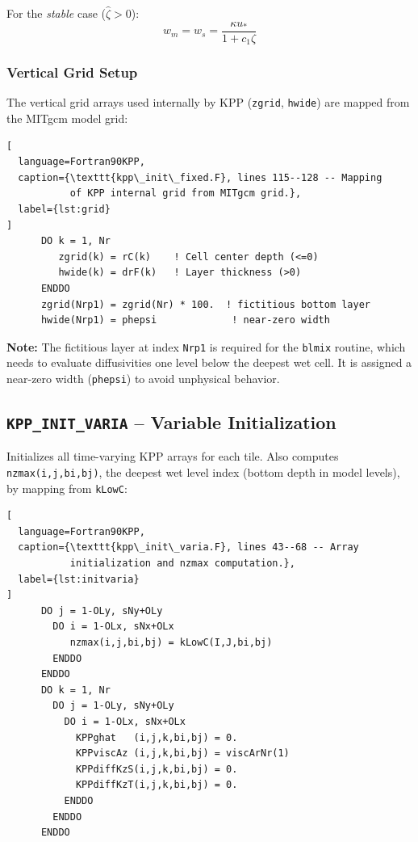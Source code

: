\documentclass[12pt,letterpaper]{article}
\newcommand{\ustar}{u_*}
\begin{document}
For the \textit{stable} case ($\hat{\zeta} > 0$):  
\begin{equation}  
w_m = w_s = \frac{\kappa \ustar}{1 + c_1 \zeta}  
\end{equation}  
  
\subsubsection{Vertical Grid Setup}  
  
The vertical grid arrays used internally by KPP (\texttt{zgrid},  
\texttt{hwide}) are mapped from the MITgcm model grid:  
  
\begin{lstlisting}[  
  language=Fortran90KPP,  
  caption={\texttt{kpp\_init\_fixed.F}, lines 115--128 -- Mapping  
           of KPP internal grid from MITgcm grid.},  
  label={lst:grid}  
]  
      DO k = 1, Nr  
         zgrid(k) = rC(k)    ! Cell center depth (<=0)  
         hwide(k) = drF(k)   ! Layer thickness (>0)  
      ENDDO  
      zgrid(Nrp1) = zgrid(Nr) * 100.  ! fictitious bottom layer  
      hwide(Nrp1) = phepsi             ! near-zero width  
\end{lstlisting}  
  
\begin{warnbox}  
\textbf{Note:} The fictitious layer at index \texttt{Nrp1} is required  
for the \texttt{blmix} routine, which needs to evaluate diffusivities  
one level below the deepest wet cell. It is assigned a near-zero width  
(\texttt{phepsi}) to avoid unphysical behavior.  
\end{warnbox}  
  
\subsection{\texttt{KPP\_INIT\_VARIA} -- Variable Initialization}  
  
Initializes all time-varying KPP arrays for each tile. Also computes  
\texttt{nzmax(i,j,bi,bj)}, the deepest wet level index (bottom depth  
in model levels), by mapping from \texttt{kLowC}:  
  
\begin{lstlisting}[  
  language=Fortran90KPP,  
  caption={\texttt{kpp\_init\_varia.F}, lines 43--68 -- Array  
           initialization and nzmax computation.},  
  label={lst:initvaria}  
]  
      DO j = 1-OLy, sNy+OLy  
        DO i = 1-OLx, sNx+OLx  
           nzmax(i,j,bi,bj) = kLowC(I,J,bi,bj)  
        ENDDO  
      ENDDO  
      DO k = 1, Nr  
        DO j = 1-OLy, sNy+OLy  
          DO i = 1-OLx, sNx+OLx  
            KPPghat   (i,j,k,bi,bj) = 0.  
            KPPviscAz (i,j,k,bi,bj) = viscArNr(1)  
            KPPdiffKzS(i,j,k,bi,bj) = 0.  
            KPPdiffKzT(i,j,k,bi,bj) = 0.  
          ENDDO  
        ENDDO  
      ENDDO  
\end{lstlisting}  
  
\end{document}
